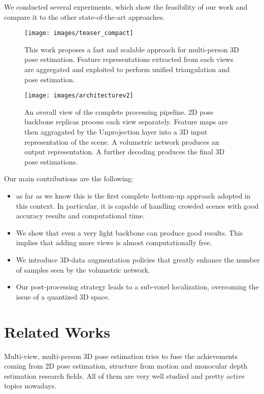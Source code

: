 \documentclass[a4paper,conference]{IEEEtran}
\begin{document}
We conducted several experiments, which show the feasibility of our work and compare it to the other state-of-the-art approaches.

\begin{figure}[!t]
\texttt{[image: images/teaser\_compact]}
\caption{This work proposes a fast and scalable approach for multi-person 3D pose estimation. Feature representations extracted from each views are aggregated and exploited to perform unified triangulation and pose estimation.}
\label{fig:teaser}
\end{figure}

\begin{figure*}[!t]
\texttt{[image: images/architecturev2]}
\caption{An overall view of the complete processing pipeline. 2D pose backbone replicas process each view separately. Feature maps are then aggragated by the Unprojection layer into a 3D input representation of the scene. A volumetric network produces an output representation. A further decoding produces the final 3D pose estimations.}
\label{fig:architecture}
\end{figure*}

Our main contributions are the following:
\begin{itemize}
\item as far as we know this is the first complete bottom-up approach adopted in this context. In particular, it is capable of handling crowded scenes with good accuracy results and computational time.
\item We show that even a very light backbone can produce good results. This implies that adding more views is almost computationally free.
\item We introduce 3D-data augmentation policies that greatly enhance the number of samples seen by the volumetric network.
\item Our post-processing strategy leads to a sub-voxel localization, overcoming the issue of a quantized 3D space.
\end{itemize}














\section{Related Works}
Multi-view, multi-person 3D pose estimation tries to fuse the achievements coming from 2D pose estimation, structure from motion and monocular depth estimation research fields. All of them are very well studied and pretty active topics nowadays.
\end{document}
